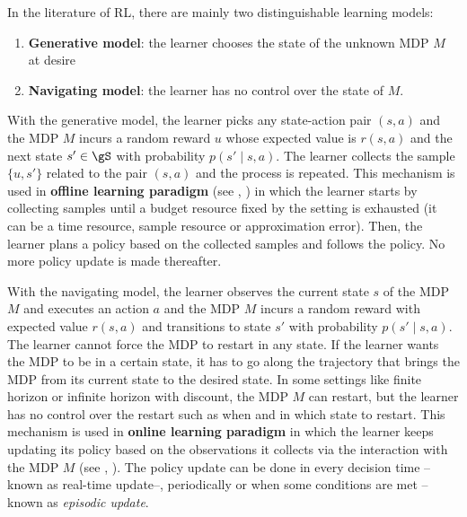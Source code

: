 
In the literature of RL, there are mainly two distinguishable learning models:
\begin{enumerate}[label=(\roman*)]
    \item \textbf{Generative model}: the learner chooses the state of the unknown MDP $M$ at desire
    \item \textbf{Navigating model}: the learner has no control over the state of $M$.
\end{enumerate}
With the generative model, the learner picks any state-action pair $(s,a)$ and the MDP $M$ incurs a random reward $u$ whose expected value is $r(s,a)$ and the next state $s'\in\gS$ with probability $p(s'\mid s,a)$.
The learner collects the sample $\{u,s'\}$ related to the pair $(s,a)$ and the process is repeated.
This mechanism is used in \textbf{offline learning paradigm} (see  \eg, \cite{lange2012batch, levine2020offline}) in which the learner starts by collecting samples until a budget resource fixed by the setting is exhausted (it can be a time resource, sample resource or approximation error). Then, the learner plans a policy based on the collected samples and follows the policy.
No more policy update is made thereafter.

With the navigating model, the learner observes the current state $s$ of the MDP $M$ and executes an action $a$ and the MDP $M$ incurs a random reward with expected value $r(s,a)$ and transitions to state $s'$ with probability $p(s'\mid s,a)$.
The learner cannot force the MDP to restart in any state.
If the learner wants the MDP to be in a certain state, it has to go along the trajectory that brings the MDP from its current state to the desired state.
In some settings like finite horizon or infinite horizon with discount, the MDP $M$ can restart, but the learner has no control over the restart such as when and in which state to restart.
This mechanism is used in \textbf{online learning paradigm} in which the learner keeps updating its policy based on the observations it collects via the interaction with the MDP $M$ (see \eg, \cite{jaksch2010near, osband2013more, azar2017minimax, ouyang2017learning,zanette2019tighter}).
The policy update can be done in every decision time --known as real-time update--, periodically or when some conditions are met --known as \emph{episodic update}.

